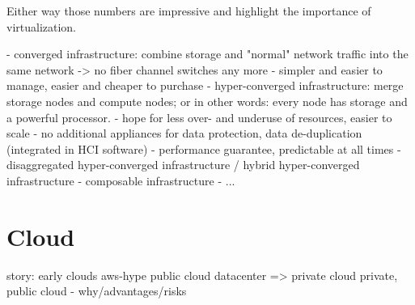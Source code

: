 Either way those numbers are impressive and highlight the importance of virtualization.


%


- converged infrastructure: combine storage and "normal" network traffic into the same network -> no fiber channel switches any more
  - simpler and easier to manage, easier and cheaper to purchase
- hyper-converged infrastructure: merge storage nodes and compute nodes; or in other words: every node has storage and a powerful processor.
  - hope for less over- and underuse of resources, easier to scale
  - no additional appliances for data protection, data de-duplication (integrated in HCI software)
  - performance guarantee, predictable at all times
- disaggregated hyper-converged infrastructure / hybrid hyper-converged infrastructure
- composable infrastructure
- ...




\section{Cloud}
story:
early clouds
aws-hype
public cloud
datacenter => private cloud
private, public cloud - why/advantages/risks


